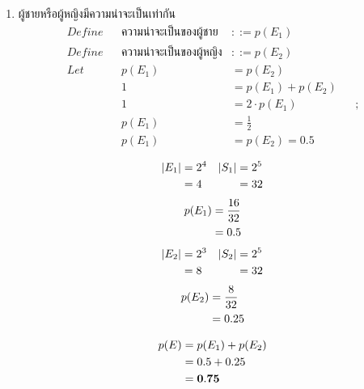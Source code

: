 \documentclass{article}
\begin{document}
\begin{enumerate}
\begin{enumerate}
	\item{ผู้ชายหรือผู้หญิงมีความน่าจะเป็นเท่ากัน}
	\begin{align*}
	Define	&&		\text{ความน่าจะเป็นของผู้ชาย}	&::=	p(E_1)			&&					\\
	Define	&&		\text{ความน่าจะเป็นของผู้หญิง}	&::=	p(E_2)			&&					\\
	Let		&&		p(E_1)						&= p(E_2)				&& \tag{1}			\\
			&&		1							&= p(E_1) + p(E_2)		&&					\\
			&&		1							&= 2 \cdot p(E_1)		&& ; \tag{1} 		\\
			&&		p(E_1)						&= \frac{1}{2}			&& \\
			&&		p(E_1)						&= p(E_2) = 0.5			&& \tag{2}
	\end{align*}

\pagebreak

	\begin{multicols}{2}
	\noindent
		\begin{align*}
		|E_1| &= 2^4 & |S_1| &= 2^5 \notag \\
		&= 4 & &= 32
		\end{align*}
		\begin{equation}
		\begin{split}
		p(E_1) &= \frac{16}{32} \notag \\
		&= 0.5
		\end{split}
		\end{equation}
	\columnbreak
		\begin{align*}
		|E_2| &= 2^3 & |S_2| &= 2^5 \notag \\
		&= 8 & &= 32
		\end{align*}
		\begin{equation}
		\begin{split}
		p(E_2) &= \frac{8}{32} \notag \\
		&= 0.25
		\end{split}
		\end{equation}
	\end{multicols}
	\noindent
	\begin{equation}
	\begin{split}
	p(E) &= p(E_1) + p(E_2) \notag \\
	&= 0.5 + 0.25 \\
	&= \mathbf{0.75}
	\end{split}
	\end{equation}


\end{enumerate}
\end{enumerate}
\end{document}

